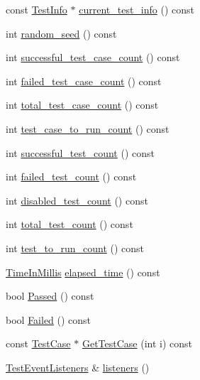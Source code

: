 \begin{DoxyCompactItemize}
const \hyperlink{classtesting_1_1TestInfo}{\-Test\-Info} $\ast$ \hyperlink{classtesting_1_1UnitTest_a7e73834280234683e770ad12dc7c5ecc}{current\-\_\-test\-\_\-info} () const 
\item 
int \hyperlink{classtesting_1_1UnitTest_ac0bcee84bdc839bfabd0a829642ab4f7}{random\-\_\-seed} () const 
\item 
int \hyperlink{classtesting_1_1UnitTest_a846de5ff509b207bca6a55237d035a1f}{successful\-\_\-test\-\_\-case\-\_\-count} () const 
\item 
int \hyperlink{classtesting_1_1UnitTest_a48f76adebf95bff36f0026f0a66c7057}{failed\-\_\-test\-\_\-case\-\_\-count} () const 
\item 
int \hyperlink{classtesting_1_1UnitTest_aba8c18261c58f301e1e80049a0781d84}{total\-\_\-test\-\_\-case\-\_\-count} () const 
\item 
int \hyperlink{classtesting_1_1UnitTest_adf212bae576e88dfb77bd114f01bc117}{test\-\_\-case\-\_\-to\-\_\-run\-\_\-count} () const 
\item 
int \hyperlink{classtesting_1_1UnitTest_ab955f67bc1fe8ef62a7e72906ccece2a}{successful\-\_\-test\-\_\-count} () const 
\item 
int \hyperlink{classtesting_1_1UnitTest_afd8bbd35c7ee99960abb321cfdff3119}{failed\-\_\-test\-\_\-count} () const 
\item 
int \hyperlink{classtesting_1_1UnitTest_a10ec677118627074973fc20c9271b204}{disabled\-\_\-test\-\_\-count} () const 
\item 
int \hyperlink{classtesting_1_1UnitTest_a0eb7286957aeb126d9926c33407a15a3}{total\-\_\-test\-\_\-count} () const 
\item 
int \hyperlink{classtesting_1_1UnitTest_aa6eccf86072f4f8ddd0bea30dfd45912}{test\-\_\-to\-\_\-run\-\_\-count} () const 
\item 
\hyperlink{namespacetesting_a338e9fd9474f0d8fafcb28b05f66a630}{\-Time\-In\-Millis} \hyperlink{classtesting_1_1UnitTest_a4f91886b546ea9cc5ba2d374a62f3a9c}{elapsed\-\_\-time} () const 
\item 
bool \hyperlink{classtesting_1_1UnitTest_ac97d5073365af8a73262fd9f6bf18656}{\-Passed} () const 
\item 
bool \hyperlink{classtesting_1_1UnitTest_a7cf078354304c964c1934f53bf2bb4d7}{\-Failed} () const 
\item 
const \hyperlink{classtesting_1_1TestCase}{\-Test\-Case} $\ast$ \hyperlink{classtesting_1_1UnitTest_adced0a9df4be306d905a3f954fc3eedf}{\-Get\-Test\-Case} (int i) const 
\item 
\hyperlink{classtesting_1_1TestEventListeners}{\-Test\-Event\-Listeners} \& \hyperlink{classtesting_1_1UnitTest_a6ff844d0f704c735e242add14a51cd50}{listeners} ()
\end{DoxyCompactItemize}
